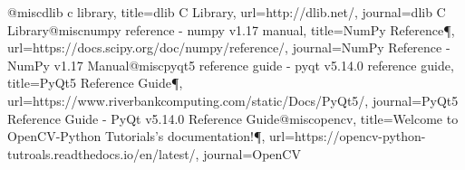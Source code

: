 @misc{dlib c library, title={dlib C Library}, url={http://dlib.net/}, journal={dlib C Library}}@misc{numpy reference - numpy v1.17 manual, title={NumPy Reference¶}, url={https://docs.scipy.org/doc/numpy/reference/}, journal={NumPy Reference - NumPy v1.17 Manual}}@misc{pyqt5 reference guide - pyqt v5.14.0 reference guide, title={PyQt5 Reference Guide¶}, url={https://www.riverbankcomputing.com/static/Docs/PyQt5/}, journal={PyQt5 Reference Guide - PyQt v5.14.0 Reference Guide}}@misc{opencv, title={Welcome to OpenCV-Python Tutorials's documentation!¶}, url={https://opencv-python-tutroals.readthedocs.io/en/latest/}, journal={OpenCV}}